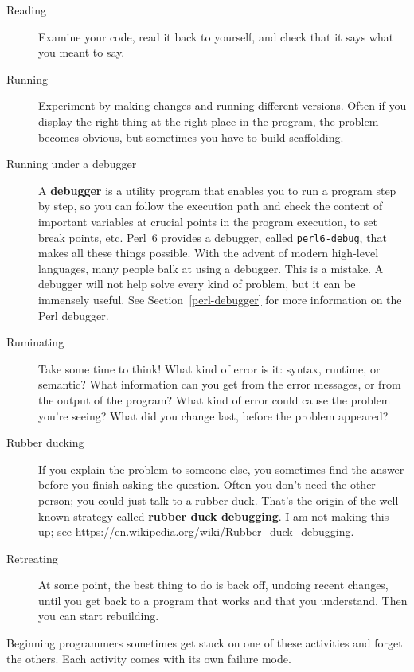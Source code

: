 \begin{description}

\item[Reading] Examine your code, read it back to yourself, and
check that it says what you meant to say.

\item[Running] Experiment by making changes and running different
versions.  Often if you display the right thing at the right place
in the program, the problem becomes obvious, but sometimes you have to
build scaffolding.

\item[Running under a debugger] A {\bf debugger} is a utility 
program that enables you to run a program step by step, 
so you can follow the execution path and check the content of important 
variables at crucial points in the program execution, to set 
break points, etc. Perl~6 provides a debugger, called 
{\tt perl6-debug}, that makes all these things possible. With the 
advent of modern high-level languages, many people balk at 
using a debugger. This is a mistake. A debugger will not help 
solve every kind of problem, but it can be immensely 
useful. See Section~\ref{perl-debugger} for more information
on the Perl debugger.

\item[Ruminating] Take some time to think!  What kind of error
is it: syntax, runtime, or semantic?  What information can you get from
the error messages, or from the output of the program?  What kind of
error could cause the problem you're seeing?  What did you change
last, before the problem appeared?

\item[Rubber ducking] If you explain the problem to someone else, you
sometimes find the answer before you finish asking the question.
Often you don't need the other person; you could just talk to a rubber
duck.  That's the origin of the well-known strategy called {\bf
rubber duck debugging}.  I am not making this up; see 
\url{https://en.wikipedia.org/wiki/Rubber_duck_debugging}.

\item[Retreating] At some point, the best thing to do is back
off, undoing recent changes, until you get back to a program that
works and that you understand.  Then you can start rebuilding.

\end{description}

Beginning programmers sometimes get stuck on one of these activities
and forget the others.  Each activity comes with its own failure
mode.

